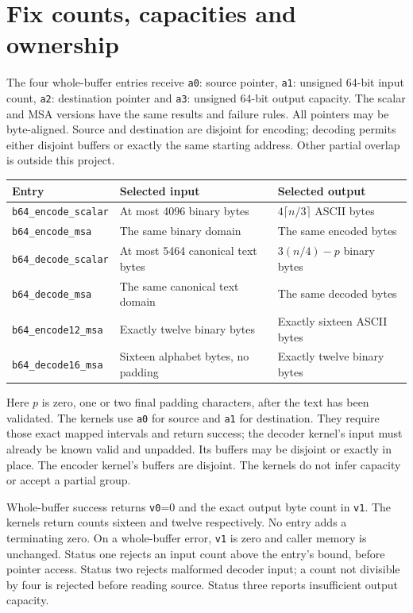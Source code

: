 \section{Fix counts, capacities and ownership}
The four whole-buffer entries receive \texttt{a0}: source pointer, \texttt{a1}: unsigned
64-bit input count, \texttt{a2}: destination pointer and \texttt{a3}: unsigned 64-bit
output capacity. The scalar and MSA versions have the same results and failure rules.
All pointers may be byte-aligned. Source and destination are disjoint for encoding;
decoding permits either disjoint buffers or exactly the same starting address. Other
partial overlap is outside this project.

\begin{longtable}{p{}p{}p{}}
Entry & Selected input & Selected output \\
\hline
\texttt{b64\_encode\_scalar} & At most 4096 binary bytes & \(4\lceil n/3\rceil\) ASCII bytes \\
\texttt{b64\_encode\_msa} & The same binary domain & The same encoded bytes \\
\texttt{b64\_decode\_scalar} & At most 5464 canonical text bytes & \(3(n/4)-p\) binary bytes \\
\texttt{b64\_decode\_msa} & The same canonical text domain & The same decoded bytes \\
\texttt{b64\_encode12\_msa} & Exactly twelve binary bytes & Exactly sixteen ASCII bytes \\
\texttt{b64\_decode16\_msa} & Sixteen alphabet bytes, no padding & Exactly twelve binary bytes \\
\end{longtable}

Here \(p\) is zero, one or two final padding characters, after the text has been
validated. The kernels use \texttt{a0} for source and \texttt{a1} for destination.
They require those exact mapped intervals and return success; the decoder kernel's
input must already be known valid and unpadded. Its buffers may be disjoint or exactly
in place. The encoder kernel's buffers are disjoint. The kernels do not infer capacity
or accept a partial group.

Whole-buffer success returns \texttt{v0}=0 and the exact output byte count in
\texttt{v1}. The kernels return counts sixteen and twelve respectively. No entry adds
a terminating zero. On a whole-buffer error, \texttt{v1} is zero and caller memory is
unchanged. Status one rejects an input count above the entry's bound, before pointer
access. Status two rejects malformed decoder input; a count not divisible by four is
rejected before reading source. Status three reports insufficient output capacity.

